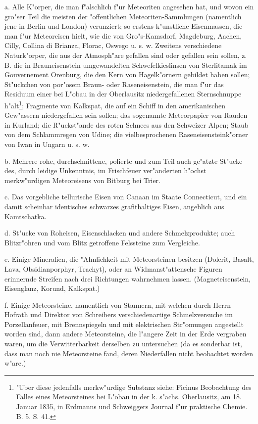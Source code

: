 \documentclass[a4paper, 11pt, oneside, polutonikogreek, german]{article}
\begin{document}
a. Alle K"orper, die man f"alschlich f"ur Meteoriten angesehen hat, und wovon ein gro"ser Teil die meisten der "offentlichen Meteoriten-Sammlungen (namentlich jene in Berlin und London) verunziert; so erstens k"unstliche Eisenmassen, die man f"ur Meteoreisen hielt, wie die von Gro"s-Kamsdorf‚ Magdeburg, Aachen, Cilly, Collina di Brianza, Florac, Oswego u. s. w. Zweitens verschiedene Naturk"orper, die aus der Atmosph"are gefallen sind oder gefallen sein sollen, z. B. die in Brauneisenstein umgewandelten Schwefelkieslinsen von Sterlitamak im Gouvernement Orenburg, die den Kern von Hagelk"ornern gebildet haben sollen; St"uckchen von por"osem Braun- oder Raseneisenstein, die man f"ur das Residuum einer bei L"obau in der Oberlausitz niedergefallenen Sternschnuppe h"alt\footnote{"Uber diese jedenfalls merkw"urdige Substanz siehe: Ficinus Beobachtung des Falles eines Meteorsteines bei L"obau in der k. s"achs. Oberlausitz, am 18. Januar 1835, in Erdmanns und Schweiggers Journal f"ur praktische Chemie. B. 5. S. 41.}; Fragmente von Kalkspat, die auf ein Schiff in den amerikanischen Gew"assern niedergefallen sein sollen; das sogenannte Meteorpapier von Rauden in Kurland; die R"uckst"ande des roten Schnees aus den Schweizer Alpen; Staub von dem Schlammregen von Udine; die vielbesprochenen Raseneisensteink"orner von Iwan in Ungarn u. s. w.

b. Mehrere rohe, durchschnittene, polierte und zum Teil auch ge"atzte St"ucke des, durch leidige Unkenntnis, im Frischfeuer ver"anderten h"ochst merkw"urdigen Meteoreisens von Bitburg bei Trier.

c. Das vorgebliche tellurische Eisen von Canaan im Staate Connecticut, und ein damit scheinbar identisches schwarzes grafithaltiges Eisen, angeblich aus Kamtschatka.

d. St"ucke von Roheisen, Eisenschlacken und andere Schmelzprodukte; auch Blitzr"ohren und vom Blitz getroffene Felssteine zum Vergleiche.

e. Einige Mineralien, die "Ahnlichkeit mit Meteorsteinen besitzen (Dolerit, Basalt, Lava, Obsidianporphyr, Trachyt), oder an Widmanst"attensche Figuren erinnernde Streifen nach drei Richtungen wahrnehmen lassen. (Magneteisenstein, Eisenglanz, Korund, Kalkspat.)

f. Einige Meteorsteine, namentlich von Stannern, mit welchen durch Herrn Hofrath und Direktor von Schreibers verschiedenartige Schmelzversuche im Porzellanfeuer, mit Brennspiegeln und mit elektrischen Str"omungen angestellt worden sind, dann andere Meteorsteine, die l"angere Zeit in der Erde vergraben waren, um die Verwitterbarkeit derselben zu untersuchen (da es sonderbar ist, dass man noch nie Meteorsteine fand, deren Niederfallen nicht beobachtet worden w"are.)
\end{document}
